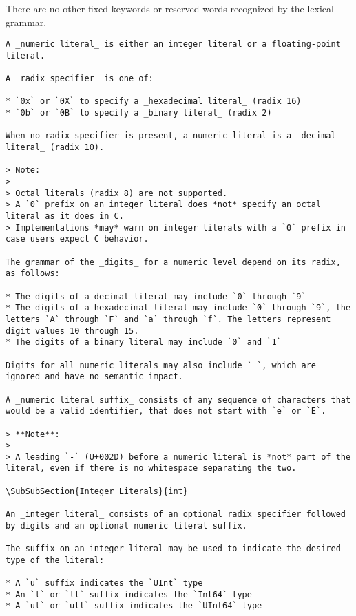 \begin{Note}
There are no other fixed keywords or reserved words recognized by the lexical grammar.
\end{Note}



\begin{verbatim}
A _numeric literal_ is either an integer literal or a floating-point literal.

A _radix specifier_ is one of:

* `0x` or `0X` to specify a _hexadecimal literal_ (radix 16)
* `0b` or `0B` to specify a _binary literal_ (radix 2)

When no radix specifier is present, a numeric literal is a _decimal literal_ (radix 10).

> Note:
>
> Octal literals (radix 8) are not supported.
> A `0` prefix on an integer literal does *not* specify an octal literal as it does in C.
> Implementations *may* warn on integer literals with a `0` prefix in case users expect C behavior.

The grammar of the _digits_ for a numeric level depend on its radix, as follows:

* The digits of a decimal literal may include `0` through `9`
* The digits of a hexadecimal literal may include `0` through `9`, the letters `A` through `F` and `a` through `f`. The letters represent digit values 10 through 15.
* The digits of a binary literal may include `0` and `1`

Digits for all numeric literals may also include `_`, which are ignored and have no semantic impact.

A _numeric literal suffix_ consists of any sequence of characters that would be a valid identifier, that does not start with `e` or `E`.

> **Note**:
>
> A leading `-` (U+002D) before a numeric literal is *not* part of the literal, even if there is no whitespace separating the two.

\SubSubSection{Integer Literals}{int}

An _integer literal_ consists of an optional radix specifier followed by digits and an optional numeric literal suffix.

The suffix on an integer literal may be used to indicate the desired type of the literal:

* A `u` suffix indicates the `UInt` type
* An `l` or `ll` suffix indicates the `Int64` type
* A `ul` or `ull` suffix indicates the `UInt64` type


\end{verbatim}
